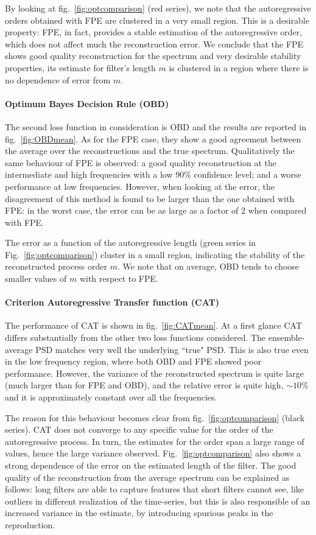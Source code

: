 \documentclass[twocolumn,showpacs,preprintnumbers,nofootinbib,prd,
superscriptaddress,10pt]{revtex4-1}
\begin{document}
By looking at fig.~\ref{fig:optcomparison} (red series), we note that the autoregressive orders obtained with FPE are clustered in a very small region. This is a desirable property: FPE, in fact, provides a stable estimation of the autoregressive order, which does not affect much the reconstruction error.
We conclude that the FPE shows good quality reconstruction for the spectrum and very desirable stability properties, its estimate for filter's length $m$ is clustered in a region where there is no dependence of error from $m$. 
\paragraph{Optimum Bayes Decision Rule (OBD)}
The second loss function in consideration is OBD and the results are reported in fig.~\ref{fig:OBDmean}. As for the FPE case, they show a good agreement between the average over the reconstructions and the true spectrum.
Qualitatively the same behaviour of FPE is observed: a good quality reconstruction at the intermediate and high frequencies with a low $90\%$ confidence level; and a worse performance at low frequencies.
However, when looking at the error, the disagreement of this method is found to be larger than the one obtained with FPE: in the worst case, the error can be as large as a factor of $2$ when compared with FPE. 

The error as a function of the autoregressive length (green series in Fig.~\ref{fig:optcomparison}) cluster in a small region, indicating the stability of the reconstructed process order $m$. We note that on average, OBD tends to choose smaller values of $m$ with respect to FPE.

\paragraph{Criterion Autoregressive Transfer function (CAT)}
The performance of CAT is shown in fig.~\ref{fig:CATmean}. At a first glance CAT differs substantially from the other two loss functions considered.
The ensemble-average PSD matches very well the underlying ``true" PSD. This is also true even in the low frequency region, 
where both OBD and FPE showed poor performance.
However, the variance of the reconstructed spectrum is quite large (much larger than for FPE and OBD), and the relative error is quite high, $\sim 10\%$ and it is approximately constant over all the frequencies.

The reason for this behaviour becomes clear from fig.~\ref{fig:optcomparison} (black series). CAT does not converge 
to any specific value for the order of the autoregressive process.
In turn, the estimates for the order span a large range of values, hence the large variance observed.
Fig.~\ref{fig:optcomparison} also shows a strong dependence of the error on the estimated length of the filter. The good quality of the reconstruction from the average spectrum can be explained as follows: long filters are able to capture features that short filters cannot see, like outliers in different realization of the time-series, but this is also responsible of an increased variance in the estimate, by introducing spurious peaks in the reproduction.
\end{document}
